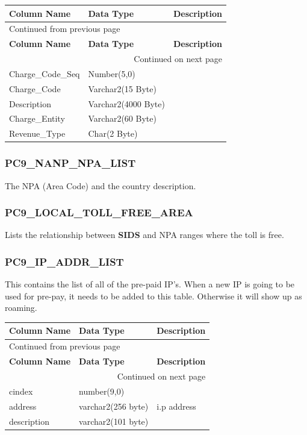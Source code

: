 \documentclass[12pt,twoside]{article}
\begin{document}
\begin{longtable}{l|l|l}
\hline
\textbf{Column Name} & \textbf{Data Type} & \textbf{Description}\\
\hline
\endfirsthead
\multicolumn{3}{l}{Continued from previous page} \\
\hline

\textbf{Column Name} & \textbf{Data Type} & \textbf{Description} \\

\hline
\endhead
\hline\multicolumn{3}{r}{Continued on next page} \\
\endfoot
\endlastfoot
\hline
Charge\_Code\_Seq & Number(5,0) & \\
Charge\_Code & Varchar2(15 Byte) & \\
Description & Varchar2(4000 Byte) & \\
Charge\_Entity & Varchar2(60 Byte) & \\
Revenue\_Type & Char(2 Byte) & \\
\hline
\end{longtable}

\normalsize
\subsubsection{PC9\_NANP\_NPA\_LIST}
\label{sec:orgheadline63}
The NPA (Area Code) and the country description.
\subsubsection{PC9\_LOCAL\_TOLL\_FREE\_AREA}
\label{sec:orgheadline64}
Lists the relationship between \textbf{SIDS} and NPA ranges where the toll is free.
\subsubsection{PC9\_IP\_ADDR\_LIST}
\label{sec:orgheadline65}
This contains the list of all of the pre-paid IP's. When a new IP is going to be used for pre-pay, it needs to be added to this table. Otherwise it will show up as roaming.
\footnotesize

\begin{longtable}{l|l|l}
\hline
\textbf{Column Name} & \textbf{Data Type} & \textbf{Description}\\
\hline
\endfirsthead
\multicolumn{3}{l}{Continued from previous page} \\
\hline

\textbf{Column Name} & \textbf{Data Type} & \textbf{Description} \\

\hline
\endhead
\hline\multicolumn{3}{r}{Continued on next page} \\
\endfoot
\endlastfoot
\hline
cindex & number(9,0) & \\
address & varchar2(256 byte) & i.p address\\
description & varchar2(101 byte) & \\
\hline
\end{longtable}
\normalsize
\newpage
\end{document}
